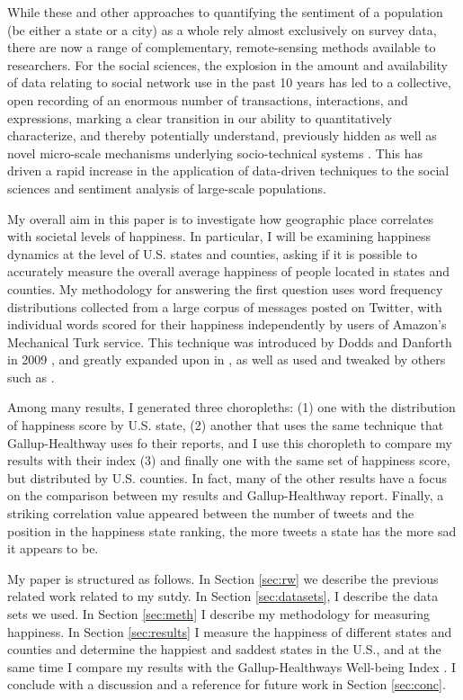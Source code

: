 \documentclass{llncs}
\begin{document}
While these and other approaches to quantifying the sentiment of a population (be either a state or a city) as a whole rely almost exclusively on survey data, there are now a range of complementary, remote-sensing methods available to researchers. For the social sciences, the explosion in the amount and availability of data relating to social network use in the past 10 years has led to a collective, open recording of an enormous number of transactions, interactions, and expressions, marking a clear transition in our ability to quantitatively characterize, and thereby potentially understand, previously hidden as well as novel micro-scale mechanisms underlying socio-technical systems \cite{Miller2011}. This has driven a rapid increase in the application of data-driven techniques to the social sciences and sentiment analysis of large-scale populations.

My overall aim in this paper is to investigate how geographic place correlates with societal levels of happiness. In particular, I will be examining happiness dynamics at the level of U.S. states and counties, asking if it is possible to accurately measure the overall average happiness of people located in states and counties. My methodology for answering the first question uses word frequency distributions collected from a large corpus of messages posted on Twitter, with individual words scored for their happiness independently by users of Amazon’s Mechanical Turk service. This technique was introduced by Dodds and Danforth in 2009 \cite{Dodds2009}, and greatly expanded upon in \cite{Dodds2011}, as well as used and tweaked by others such as \cite{Mitchell2013}.

Among many results, I generated three choropleths: (1) one with the distribution of happiness score by U.S. state, (2) another that uses the same technique that Gallup-Healthway uses fo their reports, and I use this choropleth to compare my results with their index (3) and finally one with the same set of happiness score, but distributed by U.S. counties. In fact, many of the other results have a focus on the comparison between my results and Gallup-Healthway report. Finally, a striking correlation value appeared between the number of tweets and the position in the happiness state ranking, the more tweets a state has the more sad it appears to be.

My paper is structured as follows. In Section \ref{sec:rw} we describe the previous related work related to my sutdy. In Section \ref{sec:datasets}, I describe the data sets we used. In Section \ref{sec:meth} I describe my methodology for measuring happiness. In Section \ref{sec:results} I measure the happiness of different states and counties and determine the happiest and saddest states in the U.S., and at the same time I compare my results with the Gallup-Healthways Well-being Index \cite{GallupHealthway2013}. I conclude with a discussion and a reference for future work in Section \ref{sec:conc}.
\end{document}
